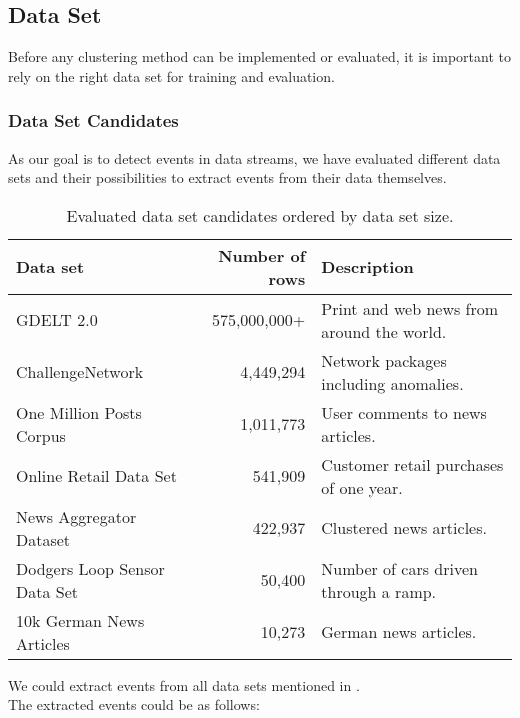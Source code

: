 \subsection{Data Set}
\label{subsec:4a_data_set}

Before any clustering method can be implemented or evaluated,
it is important to rely on the right data set for training and evaluation.

\subsubsection{Data Set Candidates}
\label{subsubsec:4a_data_set_candidates}

As our goal is to detect events in data streams, we have evaluated different data sets and
their possibilities to extract events from their data themselves.

\begin{table}[h]
    \centering
    \begin{tabular}{|l|r|l|}
    \hline
    \textbf{Data set} & \textbf{Number of rows} & \textbf{Description} \\ \hline
    GDELT 2.0 & 575,000,000+ & Print and web news from around the world. \\ \hline
    ChallengeNetwork & 4,449,294 & Network packages including anomalies. \\ \hline
    One Million Posts Corpus & 1,011,773 & User comments to news articles. \\ \hline
    Online Retail Data Set & 541,909 & Customer retail purchases of one year. \\ \hline
    News Aggregator Dataset & 422,937 & Clustered news articles. \\ \hline
    Dodgers Loop Sensor Data Set & 50,400 & Number of cars driven through a ramp. \\ \hline
    10k German News Articles & 10,273 & German news articles. \\ \hline
    \end{tabular}
    \caption{Evaluated data set candidates ordered by data set size.}
    \label{tab:data_set_candidates}
\end{table}

We could extract events from all data sets mentioned in .\\
The extracted events could be as follows:

